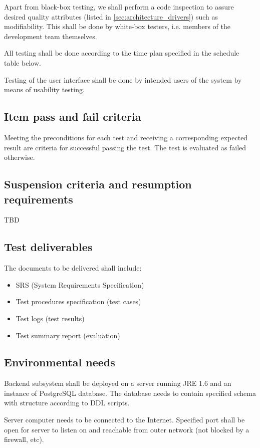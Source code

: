 \documentclass[11pt]{book}
\begin{document}
Apart from black-box testing, we shall perform a code inspection to assure desired quality attributes (listed in \ref{sec:architecture_drivers}) such as modifiability. This shall be done by white-box testers, i.e. members of the development team themselves.

All testing shall be done according to the time plan specified in the schedule table below.

Testing of the user interface shall be done by intended users of the system by means of usability testing. %

\subsection{Item pass and fail criteria}
Meeting the preconditions for each test and receiving a corresponding expected result are criteria for successful passing the test. The test is evaluated as failed otherwise.

\subsection{Suspension criteria and resumption requirements}
TBD

\subsection{Test deliverables}
The documents to be delivered shall include:

\begin{itemize}
	\item SRS (System Requirements Specification)
	\item Test procedures specification (test cases)
	\item Test logs (test results)
	\item Test summary report (evaluation)
\end{itemize}

\subsection{Environmental needs}
Backend subsystem shall be deployed on a server running JRE 1.6 and an instance of PostgreSQL database. The database needs to contain specified schema with structure according to DDL scripts.

Server computer needs to be connected to the Internet. Specified port shall be open for server to listen on and reachable from outer network (not blocked by a firewall, etc). %
\end{document}
